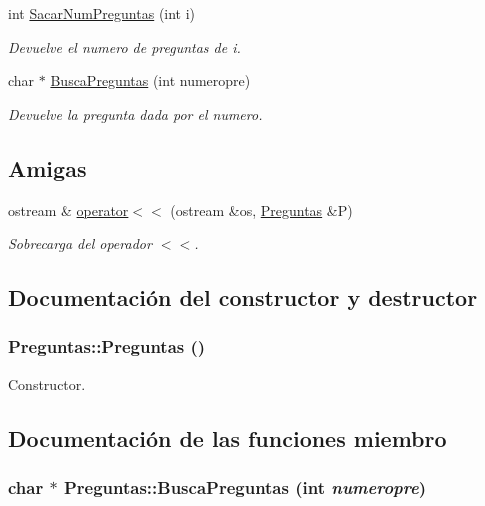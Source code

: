 \begin{CompactItemize}
int \hyperlink{class_preguntas_eb559e49da8aed155c2ce5acfe2a62a7}{SacarNumPreguntas} (int i)
\begin{CompactList}\small\item\em Devuelve el numero de preguntas de i. \item\end{CompactList}\item 
char $\ast$ \hyperlink{class_preguntas_0c0fe445f9a62114b1e071d9e52850c1}{BuscaPreguntas} (int numeropre)
\begin{CompactList}\small\item\em Devuelve la pregunta dada por el numero. \item\end{CompactList}\end{CompactItemize}
\subsection*{Amigas}
\begin{CompactItemize}
\item 
ostream \& \hyperlink{class_preguntas_f29ae837f1cb90c2cb050c3ef9247a0d}{operator$<$$<$} (ostream \&os, \hyperlink{class_preguntas}{Preguntas} \&P)
\begin{CompactList}\small\item\em Sobrecarga del operador $<$$<$. \item\end{CompactList}\end{CompactItemize}


\subsection{Documentación del constructor y destructor}
\hypertarget{class_preguntas_6aeb6fde2e549ae6f3ac34ab2c255ab7}{
\subsubsection[{Preguntas}]{\setlength{\rightskip}{0pt plus 5cm}Preguntas::Preguntas ()}}
\label{class_preguntas_6aeb6fde2e549ae6f3ac34ab2c255ab7}


Constructor. 



\subsection{Documentación de las funciones miembro}
\hypertarget{class_preguntas_0c0fe445f9a62114b1e071d9e52850c1}{
\subsubsection[{BuscaPreguntas}]{\setlength{\rightskip}{0pt plus 5cm}char $\ast$ Preguntas::BuscaPreguntas (int {\em numeropre})}}
\label{class_preguntas_0c0fe445f9a62114b1e071d9e52850c1}


